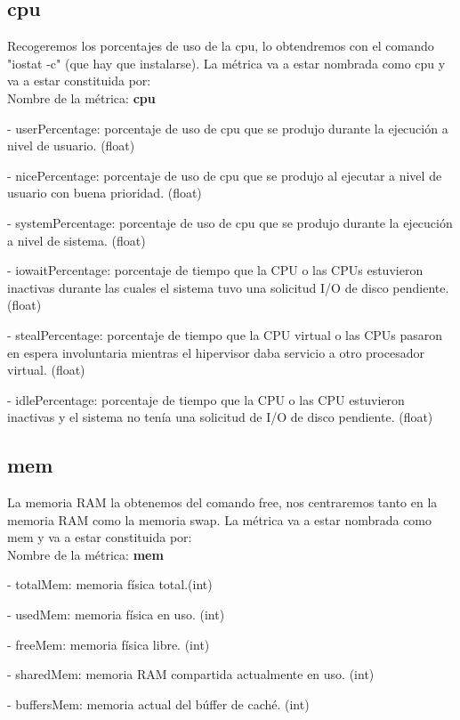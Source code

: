 \documentclass[ spanish, a4paper, 12pt, oneside]{report}
\begin{document}
\subsection{cpu}
Recogeremos los porcentajes de uso de la cpu, lo obtendremos con el comando "iostat -c" (que hay que instalarse). 
La métrica va a estar nombrada como cpu y va a estar constituida por:\\

Nombre de la métrica: \textbf{cpu}

\hyp{} userPercentage: porcentaje de uso de cpu que se produjo durante la ejecución a nivel de usuario. (float)

\hyp{} nicePercentage: porcentaje de uso de cpu que se produjo al ejecutar a nivel de usuario con buena prioridad. (float)

\hyp{} systemPercentage: porcentaje de uso de cpu que se produjo durante la ejecución a nivel de sistema. (float) 

\hyp{} iowaitPercentage: porcentaje de tiempo que la CPU o las CPUs estuvieron inactivas durante las cuales el sistema tuvo una solicitud I/O de disco pendiente. (float)

\hyp{} stealPercentage: porcentaje de tiempo que la CPU virtual o las CPUs pasaron en espera involuntaria mientras el hipervisor daba servicio a otro procesador virtual. (float)

\hyp{} idlePercentage: porcentaje de tiempo que la CPU o las CPU estuvieron inactivas y el sistema no tenía una solicitud de I/O de disco pendiente. (float)

\subsection{mem}
La memoria RAM la obtenemos del comando free, nos centraremos tanto en la memoria RAM
como la memoria swap. La métrica va a estar nombrada como mem y va a estar constituida por:\\

Nombre de la métrica: \textbf{mem}

\hyp{} totalMem: memoria física total.(int)

\hyp{} usedMem: memoria física en uso. (int)

\hyp{} freeMem: memoria física libre. (int)

\hyp{} sharedMem: memoria RAM compartida actualmente en uso. (int)

\hyp{} buffersMem: memoria actual del búffer de caché. (int)
\end{document}

